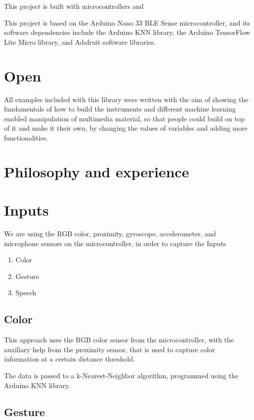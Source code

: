 This project is built with microcontrollers and 

This project is based on the Arduino Nano 33 BLE Sense microcontroller, and its software dependencies include the Arduino KNN library, the Arduino TensorFlow Lite Micro library, and Adafruit software libraries. 

\section{Open}

All examples included with this library were written with the aim of showing the fundamentals of how to build the instruments and different machine learning enabled manipulation of multimedia material, so that people could build on top of it and make it their own, by changing the values of variables and adding more functionalities.

\section{Philosophy and experience}

\section{Inputs}

We are using the RGB color, proximity, gyroscope, accelerometer, and microphone sensors on the microcontroller, in order to capture the Inputs

\begin{enumerate}
  \item Color
  \item Gesture
  \item Speech
\end{enumerate}

\subsection{Color}

This approach uses the RGB color sensor from the microcontroller, with the auxiliary help from the proximity sensor, that is used to capture color information at a certain distance threshold.

The data is passed to a k-Nearest-Neighbor algorithm, programmed using the Arduino KNN library.

\subsection{Gesture}

